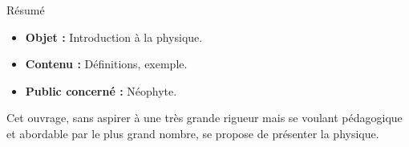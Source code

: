 \begin{center}
\Large
Résumé
\normalsize
\end{center}
\vspace{3cm}
\begin{itemize}[leftmargin=1cm, label=, itemsep=21pt]
\item {\bf Objet : } Introduction à la physique.
\item {\bf Contenu : } Définitions, exemple.
\item {\bf Public concerné : } Néophyte.
\end{itemize}

\vspace{3cm}

Cet ouvrage, sans aspirer à une très grande rigueur mais se voulant pédagogique et abordable par le plus grand nombre, se propose de présenter la physique.





